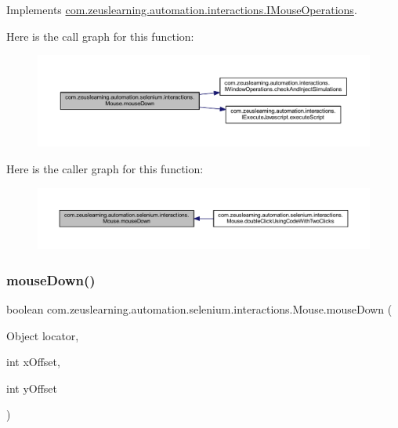 Implements \hyperlink{interfacecom_1_1zeuslearning_1_1automation_1_1interactions_1_1IMouseOperations_aa1bf6db6bfa6e6f2ed2376433c42956a}{com.\+zeuslearning.\+automation.\+interactions.\+I\+Mouse\+Operations}.

Here is the call graph for this function\+:
\nopagebreak
\begin{figure}[H]
\begin{center}
\leavevmode
\includegraphics[width=350pt]{d0/dfa/classcom_1_1zeuslearning_1_1automation_1_1selenium_1_1interactions_1_1Mouse_a208023bff8f5799e5e61dfaa190d5feb_cgraph}
\end{center}
\end{figure}
Here is the caller graph for this function\+:
\nopagebreak
\begin{figure}[H]
\begin{center}
\leavevmode
\includegraphics[width=350pt]{d0/dfa/classcom_1_1zeuslearning_1_1automation_1_1selenium_1_1interactions_1_1Mouse_a208023bff8f5799e5e61dfaa190d5feb_icgraph}
\end{center}
\end{figure}
\hypertarget{classcom_1_1zeuslearning_1_1automation_1_1selenium_1_1interactions_1_1Mouse_a1821b5da6deb7f0edd6cc7b950ef2ffe}{}\label{classcom_1_1zeuslearning_1_1automation_1_1selenium_1_1interactions_1_1Mouse_a1821b5da6deb7f0edd6cc7b950ef2ffe} 
\subsubsection{\texorpdfstring{mouse\+Down()}{mouseDown()}\hspace{0.1cm}{\footnotesize\ttfamily [2/2]}}
{\footnotesize\ttfamily boolean com.\+zeuslearning.\+automation.\+selenium.\+interactions.\+Mouse.\+mouse\+Down (\begin{DoxyParamCaption}\item[{Object}]{locator,  }\item[{int}]{x\+Offset,  }\item[{int}]{y\+Offset }\end{DoxyParamCaption})\hspace{0.3cm}{\ttfamily [inline]}}

